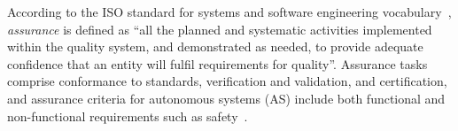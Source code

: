 \documentclass[runningheads]{llncs}
\begin{document}
According to the ISO standard for systems and software engineering vocabulary~\cite{ISO24765:2017}, \emph{assurance} is defined as ``all the planned and systematic activities implemented within the quality system, and demonstrated as needed, to provide adequate confidence that an entity will fulfil requirements for quality''.
%
Assurance tasks comprise conformance to standards, verification and validation, and certification, and assurance criteria for autonomous systems (AS) include both functional and non-functional requirements such as safety~\cite{Cheng2014}. 


\end{document}

